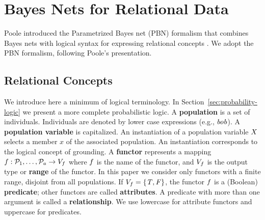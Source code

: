 \documentclass[oribibl]{llncs}
\begin{document}
\section{Bayes Nets for Relational Data} 
\label{sec:bayes-nets}

Poole introduced the Parametrized Bayes net (PBN) formalism that combines Bayes nets with logical syntax for expressing relational concepts \cite{Poole2003}. We adopt the PBN formalism, following Poole's presentation.

\subsection{Relational Concepts}  \label{sec:relational} We introduce here a minimum of logical terminology. In Section~\ref{sec:probability-logic} we present a more complete probabilistic logic. 
%
A \textbf{population} is a set of individuals. Individuals are denoted by lower case expressions (e.g., $\it{bob}$). A \textbf{population variable} is capitalized. An instantiation of a population variable $X$ selects a member $x$ of the associated population. An instantiation corresponds to the logical concept of grounding. 
%
%
%
A \textbf{functor} represents a mapping
$
f: \mathcal{P}_{1},\ldots,\mathcal{P}_{a} \rightarrow V_{f}
$
where $f$ is the name of the functor,  and $V_{f}$ is the output type or \textbf{range} of the functor. In this paper we consider only functors with a finite range, disjoint from all populations.  If $V_{f} = \{\mathit{T},\mathit{F}\}$, the functor $f$ is a (Boolean) \textbf{predicate}; other functors are called \textbf{attributes}. A predicate with more than one argument is called a \textbf{relationship}. We use lowercase for attribute functors and uppercase for predicates.


\end{document}
